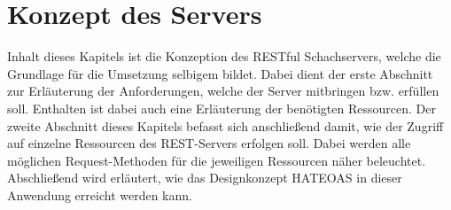 
\chapter{Konzept des Servers}\label{sec:conceptServer}
Inhalt dieses Kapitels ist die Konzeption des RESTful Schachservers, welche die Grundlage für die Umsetzung selbigem bildet. Dabei dient der erste Abschnitt zur Erläuterung der Anforderungen, welche der Server mitbringen bzw. erfüllen soll. Enthalten ist dabei auch eine Erläuterung der benötigten Ressourcen. Der zweite Abschnitt dieses Kapitels befasst sich anschließend damit, wie der Zugriff auf einzelne Ressourcen des \gls{REST}-Servers erfolgen soll. Dabei werden alle möglichen Request-Methoden für die jeweiligen Ressourcen näher beleuchtet. Abschließend wird erläutert, wie das Designkonzept HATEOAS in dieser Anwendung erreicht werden kann.

